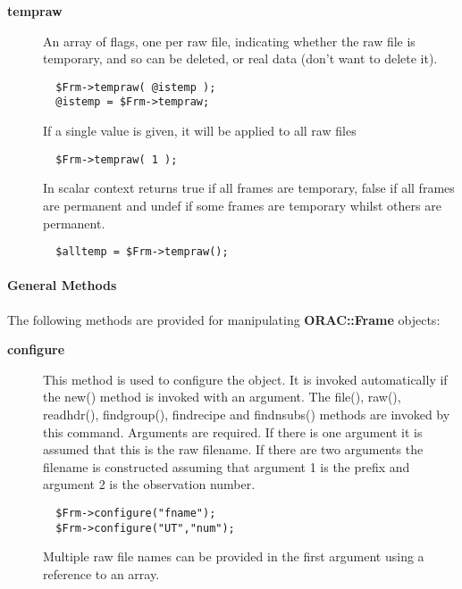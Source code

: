 \begin{description}
\begin{description}
\item[{\textbf{tempraw}}] \mbox{}

An array of flags, one per raw file, indicating whether the raw
file is temporary, and so can be deleted, or real data (don't want
to delete it).

\begin{verbatim}
  $Frm->tempraw( @istemp );
  @istemp = $Frm->tempraw;
\end{verbatim}


If a single value is given, it will be applied to all raw files

\begin{verbatim}
  $Frm->tempraw( 1 );
\end{verbatim}


In scalar context returns true if all frames are temporary,
false if all frames are permanent and undef if some frames are temporary
whilst others are permanent.

\begin{verbatim}
  $alltemp = $Frm->tempraw();
\end{verbatim}
\end{description}
\paragraph*{General Methods\label{ORAC::Frame_General_Methods}}


The following methods are provided for manipulating
\textbf{ORAC::Frame} objects:

\begin{description}

\item[{\textbf{configure}}] \mbox{}

This method is used to configure the object. It is invoked
automatically if the new() method is invoked with an argument. The
file(), raw(), readhdr(), findgroup(), findrecipe and findnsubs()
methods are invoked by this command. Arguments are required.  If there
is one argument it is assumed that this is the raw filename. If there
are two arguments the filename is constructed assuming that argument 1
is the prefix and argument 2 is the observation number.

\begin{verbatim}
  $Frm->configure("fname");
  $Frm->configure("UT","num");
\end{verbatim}


Multiple raw file names can be provided in the first argument using
a reference to an array.



\end{description}
\end{description}
